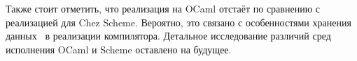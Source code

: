 Также стоит отметить, что реализация на OCaml отстаёт по сравнению с реализацией для Chez Scheme. Вероятно, это связано с особенностями хранения данных~\cite{BIBOP94} в реализации компилятора. Детальное исследование различий сред исполнения OCaml и Scheme оставлено на будущее.

